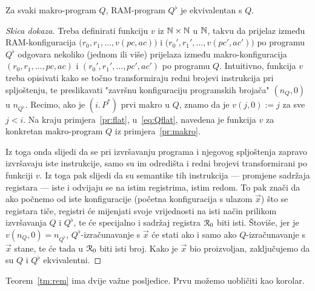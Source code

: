 \begin{teorem}[{name=[ekvivalentnost programa i njegovog spljoštenja]}]\label{tm:rem}
Za svaki makro-program $Q$, RAM-program $Q^\flat$ je ekvivalentan s $Q$.
\end{teorem}
\begin{proof}[Skica dokaza]
Treba definirati funkciju $v$ iz ${\mathbb N}\times{\mathbb N}$ u ${\mathbb N}$, takvu da prijelaz između RAM-konfiguracija $\bigl(r_0,r_1,\dotsc,v(pc,ac)\bigr)$ i $\bigl(r_0',r_1',\dotsc,v(pc',ac')\bigr)$ po programu $Q^\flat$ odgovara nekoliko (jednom ili više) prijelaza između makro-konfiguracija $(r_0,r_1,\dotsc,pc,ac)$ i $(r_0',r_1',\dotsc,pc',ac')$ po programu $Q$. Intuitivno, funkcija $v$ treba opisivati kako se točno transformiraju redni brojevi instrukcija pri spljoštenju, te preslikavati "završnu konfiguraciju programskih brojača" $(n_Q,0)$ u $n_{Q^\flat}$. Recimo, ako je $(i.\,P^*)$ prvi makro u $Q$, znamo da je $v(j,0):=j$ za sve $j<i$. Na kraju primjera~\ref{pr:flat}, u~\eqref{eq:Qflat}, navedena je funkcija $v$ za konkretan makro-program $Q$ iz primjera~\ref{pr:makro}.

Iz toga onda slijedi da se pri izvršavanju programa i njegovog spljoštenja zapravo izvršavaju iste instrukcije, samo su im odredišta i redni brojevi transformirani po funkciji $v$. Iz toga pak slijedi da su semantike tih instrukcija --- promjene sadržaja registara --- iste i odvijaju se na istim registrima, istim redom. To pak znači da ako počnemo od iste konfiguracije (početna konfiguracija s ulazom $\vec x$) što se registara tiče, registri će mijenjati svoje vrijednosti na isti način prilikom izvršavanja $Q$ i $Q^\flat$, te će specijalno i sadržaj registra $\mathcal R_{0}$ biti isti. Štoviše, jer je $v(n_Q,0)=n_{Q^\flat}$, $Q^\flat$-izračunavanje s $\vec x$ će stati ako i samo ako $Q$-izračunavanje s $\vec x$ stane, te će tada u $\mathcal R_{0}$ biti isti broj. Kako je $\vec x$ bio proizvoljan, zaključujemo da su $Q$ i $Q^\flat$ ekvivalentni.
\end{proof}

Teorem~\ref{tm:rem} ima dvije važne posljedice. Prvu možemo uobličiti kao korolar.

